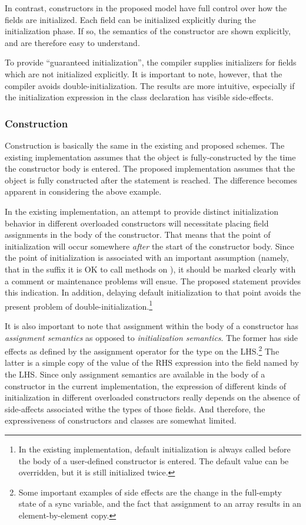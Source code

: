 In contrast, constructors in the proposed model have full control over how the
fields are initialized.  Each field can be initialized explicitly during the
initialization phase.  If so, the semantics of the constructor are shown
explicitly, and are therefore easy to understand.

To provide ``guaranteed initialization'', the compiler supplies initializers for
fields which are not initialized explicitly.  It is important to note, however,
that the compiler avoids double-initialization.  The results are more intuitive,
especially if the initialization expression in the class declaration has visible
side-effects.

\subsubsection{Construction}
Construction is basically the same in the existing and proposed schemes.
The existing implementation assumes that the object is fully-constructed by the
time the constructor body is entered.  The proposed implementation assumes that
the object is fully constructed after the  statement is reached.  The
difference becomes apparent in considering the above example.

In the existing implementation, an attempt to provide distinct
initialization behavior in different overloaded constructors will necessitate placing
field assignments in the body of the constructor.  That means that the point of
initialization will occur somewhere \emph{after} the start of the constructor
body.  Since the point of initialization is associated with an important
assumption (namely, that in the suffix it is OK to call methods on ),
it should be marked clearly with a comment or maintenance problems will ensue.
The proposed  statement provides this indication.  In addition,
delaying default initialization to that point avoids the present problem of
double-initialization.\footnote{In the existing implementation, default
initialization is always called before the body of a user-defined constructor is
entered.  The default value can be overridden, but it is still initialized twice.}

It is also important to note that assignment within the body of a constructor
has \emph{assignment semantics} as opposed to \emph{initialization semantics}.
The former has side effects as defined by the assignment operator for the type
on the LHS.\footnote{Some important examples of side effects are the change in the
full-empty state of a sync variable, and the fact that assignment to an array
results in an element-by-element copy.}  The latter is a simple copy of the
value of the RHS expression into the field named by the LHS.  Since only
assignment semantics are available in the body of a constructor in the current
implementation, the expression of different kinds of initialization in different
overloaded constructors really depends on the absence of side-affects associated
withe the types of those fields.  And therefore, the expressiveness of
constructors and classes are somewhat limited.

